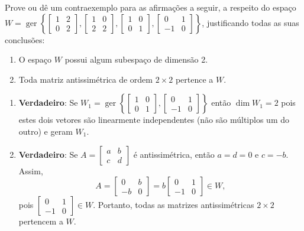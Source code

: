 \documentclass[12pt,a4paper]{article}
\newcommand*\ger[1]{\operatorname{ger}\left\{#1\right\}}
\begin{document}
\begin{ExerciseList}
\Exercise[title={2,5}] Prove ou dê um contraexemplo para as afirmações a seguir, a respeito do espaço $W = \ger{
\begin{bmatrix}
1 & 2 \\ 0 & 2
\end{bmatrix},
\begin{bmatrix}
1 & 0 \\ 2 & 2
\end{bmatrix},
\begin{bmatrix}
1 & 0 \\ 0 & 1
\end{bmatrix},
\begin{bmatrix}
0 & 1 \\ -1 & 0
\end{bmatrix}
}$, justificando todas as suas conclusões:
\begin{enumerate}
\item O espaço $W$ possui algum subespaço de dimensão 2.
\item Toda matriz antissimétrica de ordem $2 \times 2$ pertence a $W$.
\end{enumerate}
\Answer
\begin{enumerate}
\item \textbf{Verdadeiro}: Se $W_1 = \ger{
\begin{bmatrix}
1 & 0 \\ 0 & 1
\end{bmatrix},
\begin{bmatrix}
0 & 1 \\ -1 & 0
\end{bmatrix}
}$ então $\dim W_1 = 2$ pois estes dois vetores são linearmente independentes (não são múltiplos um do outro) e geram $W_1$.
\item \textbf{Verdadeiro}: Se $A =
\begin{bmatrix}
a & b \\ c & d
\end{bmatrix}
$ é antissimétrica, então $a=d=0$ e $c=-b$. Assim,
\[
A =
\begin{bmatrix}
0 & b \\ -b & 0
\end{bmatrix}
=b \begin{bmatrix}
0 & 1 \\ -1 & 0
\end{bmatrix}
\in W,
\]
pois $\begin{bmatrix}
0 & 1 \\ -1 & 0
\end{bmatrix}
\in W$. Portanto, todas as matrizes antissimétricas $2\times 2$ pertencem a $W$.
\end{enumerate}


\end{ExerciseList}
\end{document}
